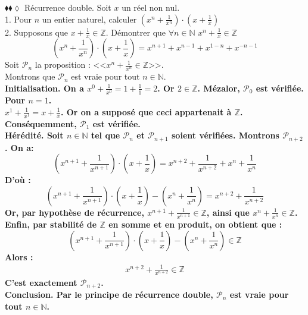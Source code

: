 \documentclass[11pt]{article}
\begin{document}
\begin{exercice}{$\blacklozenge\blacklozenge\lozenge$ Récurrence double.}{}
    Soit $x$ un réel non nul.\\
    1. Pour $n$ un entier naturel, calculer $(x^n+\frac{1}{x^n})\cdot(x+\frac{1}{x})$\\
    2. Supposons que $x+\frac{1}{x}\in\mathbb{Z}$. Démontrer que $\forall n\in\mathbb{N}$ $x^n + \frac{1}{x}\in\mathbb{Z}$
    \tcblower
    \begin{equation*}
        (x^n + \frac{1}{x^n})\cdot(x+\frac{1}{x}) = x^{n+1}+x^{n-1}+x^{1-n}+x^{-n-1}
    \end{equation*}
     Soit $\mathcal{P}_n$ la proposition : <<$x^n+\frac{1}{x^n}\in\mathbb{Z}$>>.\\
    Montrons que $\mathcal{P}_n$ est vraie pour tout $n\in\mathbb{N}$.\\
    \bf{Initialisation.} On a $x^0 + \frac{1}{x^0} = 1 + \frac{1}{1} = 2$. Or $2\in\mathbb{Z}$. Mézalor, $\mathcal{P}_0$ est vérifiée.\\
    Pour $n=1$.\\
    $x^1 + \frac{1}{x^1} = x + \frac{1}{x}$. Or on a supposé que ceci appartenait à $\mathbb{Z}$. Conséquemment, $\mathcal{P}_1$ est vérifiée.\\[0.5cm]
    \bf{Hérédité.} Soit $n\in\mathbb{N}$ tel que $\mathcal{P}_n$ et $\mathcal{P}_{n+1}$ soient vérifiées. Montrons $\mathcal{P}_{n+2}$. On a:
    \begin{equation*}
        (x^{n+1}+\frac{1}{x^{n+1}})\cdot(x+\frac{1}{x})=x^{n+2}+\frac{1}{x^{n+2}}+x^n+\frac{1}{x^{n}}
    \end{equation*}
    D'où :
    \begin{equation*}
        (x^{n+1}+\frac{1}{x^{n+1}})\cdot(x+\frac{1}{x})-(x^n+\frac{1}{x^n}) = x^{n+2}+\frac{1}{x^{n+2}}
    \end{equation*}
    Or, par hypothèse de récurrence, $x^{n+1}+\frac{1}{x^{n+1}}\in\mathbb{Z}$, ainsi que $x^n+\frac{1}{x^n}\in\mathbb{Z}$.\\
    Enfin, par stabilité de $\mathbb{Z}$ en somme et en produit, on obtient que :
    \begin{equation*}
        (x^{n+1}+\frac{1}{x^{n+1}})\cdot(x+\frac{1}{x})-(x^n+\frac{1}{x^n})\in\mathbb{Z}
    \end{equation*}
    Alors :
    \begin{align*}
        x^{n+2} + \frac{1}{x^{n+2}} \in \mathbb{Z}
    \end{align*}
    C'est exactement $\mathcal{P}_{n+2}$.\\
    \bf{Conclusion.} Par le principe de récurrence double, $\mathcal{P}_n$ est vraie pour tout $n\in\mathbb{N}$.
\end{exercice}
\end{document}
